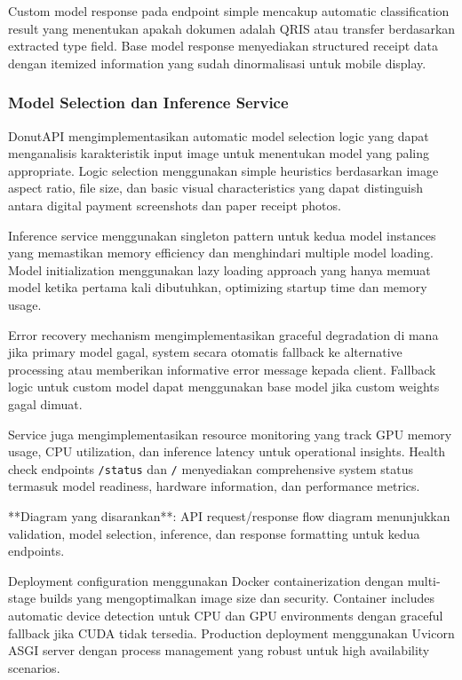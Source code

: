 Custom model response pada endpoint simple mencakup automatic classification result yang menentukan apakah dokumen adalah QRIS atau transfer berdasarkan extracted type field. Base model response menyediakan structured receipt data dengan itemized information yang sudah dinormalisasi untuk mobile display.

\subsubsection{Model Selection dan Inference Service}
\label{subsubsec:model-selection-inference}

DonutAPI mengimplementasikan automatic model selection logic yang dapat menganalisis karakteristik input image untuk menentukan model yang paling appropriate. Logic selection menggunakan simple heuristics berdasarkan image aspect ratio, file size, dan basic visual characteristics yang dapat distinguish antara digital payment screenshots dan paper receipt photos.

Inference service menggunakan singleton pattern untuk kedua model instances yang memastikan memory efficiency dan menghindari multiple model loading. Model initialization menggunakan lazy loading approach yang hanya memuat model ketika pertama kali dibutuhkan, optimizing startup time dan memory usage.

Error recovery mechanism mengimplementasikan graceful degradation di mana jika primary model gagal, system secara otomatis fallback ke alternative processing atau memberikan informative error message kepada client. Fallback logic untuk custom model dapat menggunakan base model jika custom weights gagal dimuat.

Service juga mengimplementasikan resource monitoring yang track GPU memory usage, CPU utilization, dan inference latency untuk operational insights. Health check endpoints \texttt{/status} dan \texttt{/} menyediakan comprehensive system status termasuk model readiness, hardware information, dan performance metrics.

**Diagram yang disarankan**: API request/response flow diagram menunjukkan validation, model selection, inference, dan response formatting untuk kedua endpoints.

Deployment configuration menggunakan Docker containerization dengan multi-stage builds yang mengoptimalkan image size dan security. Container includes automatic device detection untuk CPU dan GPU environments dengan graceful fallback jika CUDA tidak tersedia. Production deployment menggunakan Uvicorn ASGI server dengan process management yang robust untuk high availability scenarios.

